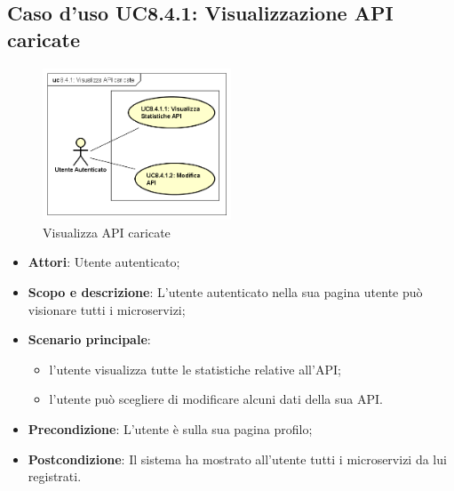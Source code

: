 \documentclass[12pt,a4paper,titlepage]{article}
\begin{document}
	\subsection{Caso d'uso UC8.4.1: Visualizzazione API caricate}
	\label{UC8.4.1}
	\begin{figure}[H]
		\centering
		\includegraphics[width=0.5\textwidth]{UseCase/APICaricate}
		\caption{Visualizza API caricate}
	\end{figure}
	\begin{itemize}
		\item \textbf{Attori}: Utente autenticato;
		\item \textbf{Scopo e descrizione}: L'utente autenticato nella sua pagina utente può visionare tutti i microservizi;
		\item \textbf{Scenario principale}:
			\begin{itemize}
				\item l'utente visualizza tutte le statistiche relative all'API;
				\item l'utente può scegliere di modificare alcuni dati della sua API.
			\end{itemize}
		\item \textbf{Precondizione}: L'utente è sulla sua pagina profilo;
		\item \textbf{Postcondizione}: Il sistema ha mostrato all'utente tutti i microservizi da lui registrati.
	\end{itemize}
\end{document}
